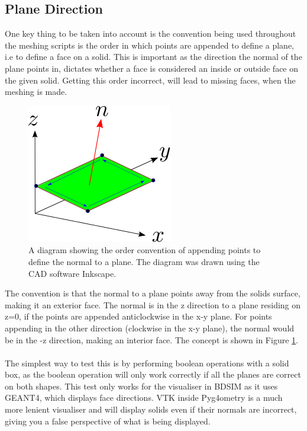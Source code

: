 \documentclass[12pt,a4paper]{article}
\begin{document}
\subsection{Plane Direction}
\label{order}
One key thing to be taken into account is the convention being used throughout the meshing scripts is the order in which points are appended to define a plane, i.e to define a face on a solid. This is important as the direction the normal of the plane points in, dictates whether a face is considered an inside or outside face on the given solid. Getting this order incorrect, will lead to missing faces, when the meshing is made.
\begin{figure}[h!]
\centering
\includegraphics[scale=0.7]{Images//append_points//Point_Appending_Order.png}
\caption[width=\columnwidth]{A diagram showing the order convention of appending points to define the normal to a plane. The diagram was drawn using the CAD software Inkscape.}
\label{pointsorder}
\end{figure}
\newpage
\noindent The convention is that the normal to a plane points away from the solids surface, making it an exterior face. The normal is in the z direction to a plane residing on z=0, if the points are appended anticlockwise in the x-y plane. For points appending in the other direction (clockwise in the x-y plane), the normal would be in the -z direction, making an interior face. The concept is shown in Figure \ref{pointsorder}.
\\\\
The simplest way to test this is by performing boolean operations with a solid box, as the boolean operation will only work correctly if all the planes are correct on both shapes. This test only works for the visualiser in BDSIM as it uses GEANT4, which displays face directions. VTK inside Pyg4ometry is a much more lenient visualiser and will display solids even if their normals are incorrect, giving you a false perspective of what is being displayed.
\end{document}
